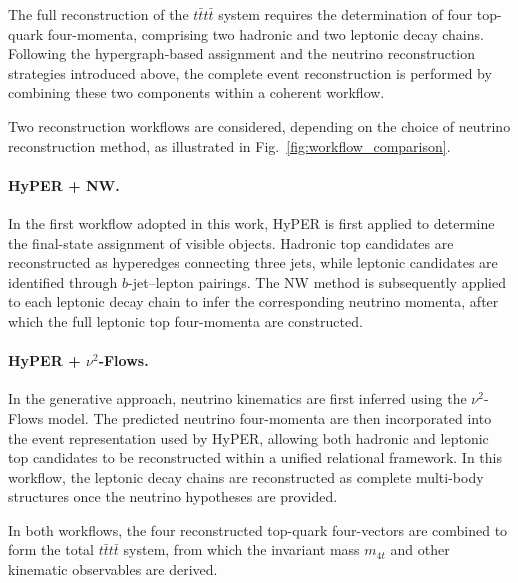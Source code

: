 The full reconstruction of the $t\bar{t}t\bar{t}$ system requires the determination of four top-quark four-momenta, comprising two hadronic and two leptonic decay chains. 
Following the hypergraph-based assignment and the neutrino reconstruction strategies introduced above, the complete event reconstruction is performed by combining these two components within a coherent workflow.

Two reconstruction workflows are considered, depending on the choice of neutrino reconstruction method, as illustrated in Fig.~\ref{fig:workflow_comparison}.

\paragraph{HyPER + NW.}

In the first workflow adopted in this work, HyPER is first applied to determine the final-state assignment of visible objects. 
Hadronic top candidates are reconstructed as hyperedges connecting three jets, while leptonic candidates are identified through $b$-jet–lepton pairings. 
The NW method is subsequently applied to each leptonic decay chain to infer the corresponding neutrino momenta, after which the full leptonic top four-momenta are constructed.

\paragraph{HyPER + \texorpdfstring{$\nu^2$}{nu2}-Flows.}

In the generative approach, neutrino kinematics are first inferred using the $\nu^2$-Flows model. 
The predicted neutrino four-momenta are then incorporated into the event representation used by HyPER, allowing both hadronic and leptonic top candidates to be reconstructed within a unified relational framework. 
In this workflow, the leptonic decay chains are reconstructed as complete multi-body structures once the neutrino hypotheses are provided.

In both workflows, the four reconstructed top-quark four-vectors are combined to form the total $t\bar{t}t\bar{t}$ system, from which the invariant mass $m_{4t}$ and other kinematic observables are derived.

